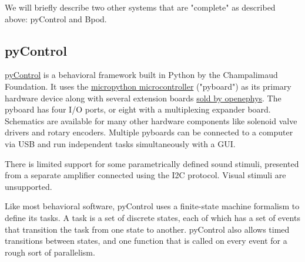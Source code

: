 \documentclass[nohyper, justified, notitlepage, marginals=raggedright,twoside=false,debug]{tufte-autopilot}
\begin{document}
We will briefly describe two other systems that are "complete" as described above: pyControl and Bpod.

\subsection{pyControl}

\href{https://pycontrol.readthedocs.io/en/latest/}{pyControl} is a behavioral framework built in Python by the Champalimaud Foundation. It uses the \href{https://micropython.org/}{micropython microcontroller} ("pyboard") as its primary hardware device along with several extension boards \href{http://www.open-ephys.org/store/pycontrol}{sold by openephys}. The pyboard has four I/O ports, or eight with a multiplexing expander board. Schematics are available for many other hardware components like solenoid valve drivers and rotary encoders. Multiple pyboards can be connected to a computer via USB and run independent tasks simultaneously with a GUI.

There is limited support for some parametrically defined sound stimuli, presented from a separate amplifier connected using the I2C protocol. Visual stimuli are unsupported.

Like most behavioral software, pyControl uses a finite-state machine formalism to define its tasks. A task is a set of discrete states, each of which has a set of events that transition the task from one state to another. pyControl also allows timed transitions between states, and one function that is called on every event for a rough sort of parallelism.
\end{document}
